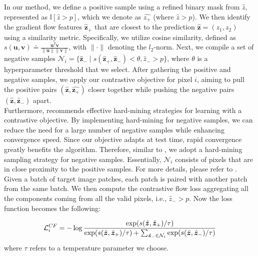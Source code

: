 In our method, we define a positive sample using a refined binary mask from $\hat{z}$, represented as $\mathbb{I}[\hat{z}>p]$, which we denote as $\hat{z_+}$ (where $\hat{z} > p$). We then identify the gradient flow features $\hat{\bm{z}}_+$ that are closest to the prediction $\hat{\bm{z}} = (z_1, z_2)$ using a similarity metric. Specifically, we utilize cosine similarity, defined as $s(\bm{u}, \bm{v}) \doteq \frac{\bm{u}^T \bm{v}}{\| \bm{u} \| \| \bm{v} \|}$, with $\| \cdot \|$ denoting the $l_2$-norm. Next, we compile a set of negative samples $\mathcal{N}_i = \{\hat{\bm{z}}_- \; | \; s(\hat{\bm{z}}_+, \hat{\bm{z}}_-) < \theta, \hat{z}_- > p\}$, where $\theta$ is a hyperparameter threshold that we select. After gathering the positive and negative samples, we apply our contrastive objective for pixel $i$, aiming to pull the positive pairs $(\hat{\bm{z}}, \hat{\bm{z}_+})$ closer together while pushing the negative pairs $(\hat{\bm{z}}, \hat{\bm{z}}_-)$ apart. \\

Furthermore, \cite{wang2021understanding} recommends effective hard-mining strategies for learning with a contrastive objective. By implementing hard-mining for negative samples, we can reduce the need for a large number of negative samples while enhancing convergence speed. Since our objective adapts at test time, rapid convergence greatly benefits the algorithm. Therefore, similar to \cite{keaton2023celltranspose}, we adopt a hard-mining sampling strategy for negative samples. Essentially, $\mathcal{N}_i$ consists of pixels that are in close proximity to the positive samples. For more details, please refer to \cite{keaton2023celltranspose}.\\

Given a batch of target image patches, each patch is paired with another patch from the same batch. We then compute the contrastive flow loss aggregating all the components coming from all the valid pixels, i.e.,  $\hat{z}_- > p$. 
Now the loss function becomes the following:

\begin{equation}
    \small
    \mathcal{L}_i^{CF} = - \log \frac{\exp( s (\hat{\bm{ z}}, \hat{\bm{ z}}_+)/\tau )}{ \exp( s (\hat{\bm{ z}}, \hat{\bm{ z}}_+)/\tau ) + \sum_{\hat{\bm{ z}}_- \in \mathcal{N}_i} \exp( s (\hat{\bm{ z}}, \hat{\bm{ z}}_-)/\tau ) }\\
    \label{eq-contrastive-flow-loss}
  \end{equation}
where $\tau$ refers to a temperature parameter we choose. 

